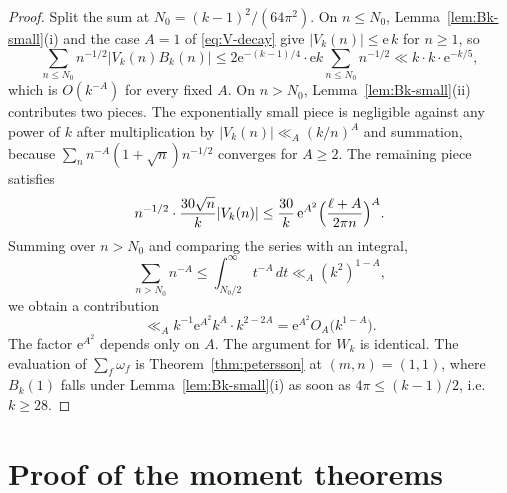 \documentclass[11pt]{amsart}
\theoremstyle{definition}
\theoremstyle{remark}
\numberwithin{equation}{section}
\newcommand{\ee}{\mathrm{e}}
\begin{document}
\begin{proof}
Split the sum at $N_0=(k-1)^2/(64\pi^2)$. On $n\le N_0$, Lemma~\ref{lem:Bk-small}(i) and the case $A=1$ of \eqref{eq:V-decay} give $\lvert V_k(n)\rvert\le\ee\, k$ for $n\ge 1$, so
\[
\sum_{n\le N_0}n^{-1/2}\lvert V_k(n)B_k(n)\rvert
\le 2\ee^{-(k-1)/4}\cdot\ee k\sum_{n\le N_0}n^{-1/2}
\ll k\cdot k\cdot\ee^{-k/5},
\]
which is $O(k^{-A})$ for every fixed $A$. On $n>N_0$, Lemma~\ref{lem:Bk-small}(ii) contributes two pieces. The exponentially small piece is negligible against any power of $k$ after multiplication by $\lvert V_k(n)\rvert\ll_A (k/n)^A$ and summation, because $\sum_n n^{-A}(1+\sqrt n)n^{-1/2}$ converges for $A\ge 2$. The remaining piece satisfies
\[
n^{-1/2}\cdot\frac{30\sqrt n}{k}\lvert V_k(n)\rvert
\le\frac{30}{k}\,\ee^{A^2}\Bigl(\frac{\ell+A}{2\pi n}\Bigr)^A.
\]
Summing over $n>N_0$ and comparing the series with an integral,
\[
\sum_{n>N_0}n^{-A}
\le\int_{N_0/2}^\infty t^{-A}\,dt
\ll_A (k^2)^{1-A},
\]
we obtain a contribution
\[
\ll_A k^{-1}\ee^{A^2}k^{A}\cdot k^{2-2A}
=\ee^{A^2}O_A\bigl(k^{1-A}\bigr).
\]
The factor $\ee^{A^2}$ depends only on $A$. The argument for $W_k$ is identical. The evaluation of $\sum_f\omega_f$ is Theorem~\ref{thm:petersson} at $(m,n)=(1,1)$, where $B_k(1)$ falls under Lemma~\ref{lem:Bk-small}(i) as soon as $4\pi\le(k-1)/2$, i.e.\ $k\ge 28$.
\end{proof}

\section{Proof of the moment theorems}
\label{sec:moments}
\end{document}
